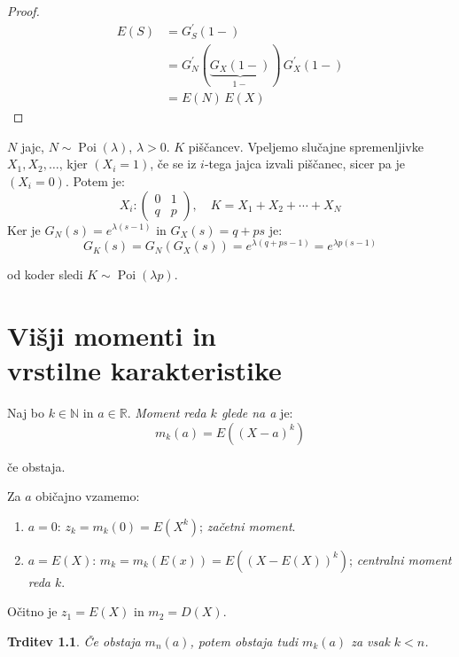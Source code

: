 \documentclass[12pt]{book}
\def\n{\noindent}
\theoremstyle{definition}
\theoremstyle{plain}
\theoremstyle{plain}
\newtheorem{trditev}{Trditev}
\theoremstyle{plain}
\theoremstyle{remark}
\begin{document}
\begin{proof}
    \begin{align*}
        E(S)&=G_S^{\prime}(1-) \\
        &=G_N^{\prime}(\underbrace{G_X(1-)}_{1-}) \, G_X^{\prime}(1-) \\
        &=E(N) \, E(X)
    \end{align*}
\end{proof}

\begin{zgled}
    $N$ jajc, $N \sim \operatorname{Poi}(\lambda)$, $\lambda > 0$. $K$ piščancev. Vpeljemo slučajne spremenljivke $X_1, X_2, \ldots$, kjer $(X_i=1)$, če se iz $i$-tega jajca izvali piščanec, sicer pa je $(X_i=0)$. Potem je: 
    $$
    X_i:\left(\begin{array}{cc}
        0 & 1 \\
        q & p
        \end{array}\right), \quad K = X_1 + X_2 + \cdots + X_N
    $$
    Ker je $G_N(s)=e^{\lambda (s-1)}$ in $G_X(s)=q+p  s$ je: 
    $$
    G_K(s)=G_N\left(G_X(s)\right)=e^{\lambda(q+p s-1)}=e^{\lambda p(s-1)}
    $$

    od koder sledi $K \sim \operatorname{Poi}(\lambda p)$.
\end{zgled}

\chapter[Višji momenti in vrstilne karakteristike]{Višji momenti in\\vrstilne karakteristike}

\n Naj bo $k \in \mathbb{N}$ in $a \in \mathbb{R}$. \emph{Moment reda $k$ glede na a} je:
$$
m_k(a)=E\left((X-a)^k\right)
$$

če obstaja. 

\n Za $a$ običajno vzamemo: 
\begin{enumerate}
    \item $a=0$: $z_k=m_k(0)=E\left(X^k\right)$; \emph{začetni moment}. 
    \item $a=E(X)$: $m_k=m_k(E(x))=E\left((X-E(X))^k\right)$; \emph{centralni moment reda $k$}.
\end{enumerate}

\n Očitno je $z_1=E(X)$ in $m_2=D(X)$. 

\begin{trditev}
    Če obstaja $m_n(a)$, potem obstaja tudi $m_k(a)$ za vsak $k<n$.
\end{trditev}
\end{document}
